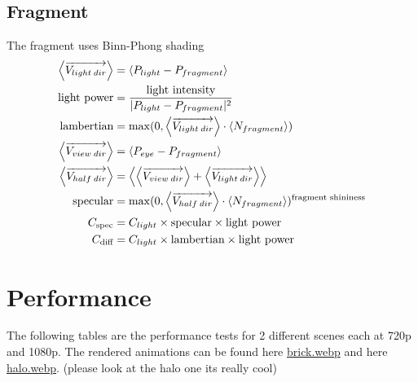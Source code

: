 \documentclass[12pt]{article}
\begin{document}
\subsection{Fragment}
The fragment uses Binn-Phong shading 
\begin{gather*}\begin{aligned}
		\left\langle \overrightarrow{V_{light\hspace{0.2em}dir}} \right\rangle
			&=
			\left\langle P_{light}-P_{fragment}\right\rangle \notag\\
		\text{light power} 
			&= 
			\frac{\text{light intensity}}{| P_{light}-P_{fragment}|^2}\\
		\text{lambertian} 
			&= \max(0, \left\langle 
			\overrightarrow{V_{light\hspace{0.2em}dir}} \right\rangle \cdot   \left\langle N_{fragment}\right\rangle) \\
		\left\langle\overrightarrow{V_{view\hspace{0.2em}dir}} \right\rangle 
		&= 
		\left\langle P_{eye}-P_{fragment}\right\rangle\\
		\left\langle\overrightarrow{V_{half\hspace{0.2em}dir}} \right\rangle 
		&= 
			\left\langle 
				\left\langle\overrightarrow{V_{view\hspace{0.2em}dir}} \right\rangle
				+
				\left\langle \overrightarrow{V_{light\hspace{0.2em}dir}}  \right\rangle
			\right\rangle \\
		\text{specular} &= \max(0, 
			\left\langle\overrightarrow{V_{half\hspace{0.2em}dir}} \right\rangle
			\cdot
			\left\langle N_{fragment}\right\rangle			
		)^{\text{fragment shininess}}\\
		C_{\text{spec}} &= C_{light}\times \text{specular} \times \text{light power}\\
		C_{\text{diff}} &= C_{light}\times \text{lambertian} \times \text{light power}
\end{aligned}\end{gather*}


\section{Performance}
The following tables are the performance tests for 2 different scenes each at 720p and 1080p. The rendered animations can be found here
\href{https://github.com/ParkerTenBroeck/3P93/blob/dff1995021a7f66e8c5a2a137551acbd2b20739f/p2/code/examples/brick.webp}{brick.webp}
and here
\href{https://github.com/ParkerTenBroeck/3P93/blob/dff1995021a7f66e8c5a2a137551acbd2b20739f/p2/code/examples/halo.webp}{halo.webp}. (please look at the halo one its really cool)
\end{document}
